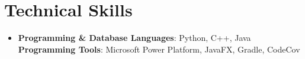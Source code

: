 \documentclass[letterpaper,11pt]{article}
\newcommand{\sectionwithvspace}[1]{%
  \vspace{-10pt}
  \section{#1}
  \vspace{-2pt}
}
\begin{document}
\sectionwithvspace{Technical Skills}
 \begin{itemize}[leftmargin=0.15in, label={}, topsep=0pt, partopsep=0pt]
    \item\small{
     \textbf{Programming \& Database Languages}{: Python, C++, Java} \\
     \textbf{Programming Tools}{: Microsoft Power Platform, JavaFX, Gradle, CodeCov}
    }
 \end{itemize}

\end{document}
